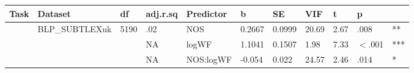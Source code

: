 \begin{table}[ht]
\centering
\begingroup\normalsize
\begin{tabular}{lllllllllll}
  \hline
Task & Dataset & df & adj.r.sq & Predictor & b & SE & VIF & t & p &  \\ 
  \hline
 & BLP\_SUBTLEXuk & 5190 & .02 & NOS & 0.2667 & 0.0999 & 20.69 & 2.67 & .008 & ** \\ 
   &  &  & NA & logWF & 1.1041 & 0.1507 & 1.98 & 7.33 & $<$.001 & *** \\ 
   &  &  & NA & NOS:logWF & -0.054 & 0.022 & 24.57 & 2.46 & .014 & * \\ 
   \hline
\end{tabular}
\endgroup
\end{table}
